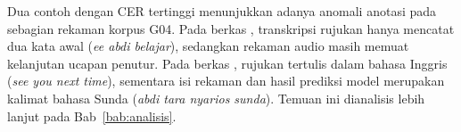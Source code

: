 Dua contoh dengan CER tertinggi menunjukkan adanya anomali anotasi pada sebagian rekaman korpus G04. Pada berkas , transkripsi rujukan hanya mencatat dua kata awal (\textit{ee abdi belajar}), sedangkan rekaman audio masih memuat kelanjutan ucapan penutur. Pada berkas , rujukan tertulis dalam bahasa Inggris (\textit{see you next time}), sementara isi rekaman dan hasil prediksi model merupakan kalimat bahasa Sunda (\textit{abdi tara nyarios sunda}). Temuan ini dianalisis lebih lanjut pada Bab~\ref{bab:analisis}.
